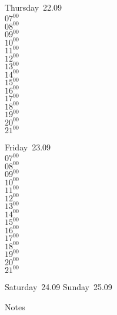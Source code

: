 \documentclass[11pt,a4paper]{book}\usepackage[]{graphicx}\usepackage[]{color}
\begin{document}
\clearpage
\begin{headerbox}
\end{headerbox}
\begin{weekdaybox}
  Thursday~22.09\\
  { 
  \vfill
  $07^{00}$\\
$08^{00}$\\
$09^{00}$\\
$10^{00}$\\
$11^{00}$\\
$12^{00}$\\
$13^{00}$\\
$14^{00}$\\
$15^{00}$\\
$16^{00}$\\
$17^{00}$\\
$18^{00}$\\
$19^{00}$\\
$20^{00}$\\
$21^{00}$\\
  }
\end{weekdaybox} 
\begin{weekdaybox}
  Friday~23.09\\
  { 
  \vfill
  $07^{00}$\\
$08^{00}$\\
$09^{00}$\\
$10^{00}$\\
$11^{00}$\\
$12^{00}$\\
$13^{00}$\\
$14^{00}$\\
$15^{00}$\\
$16^{00}$\\
$17^{00}$\\
$18^{00}$\\
$19^{00}$\\
$20^{00}$\\
$21^{00}$\\
  }
\end{weekdaybox}
\begin{weekendbox}
  Saturday~24.09
  \tcblower
  Sunday~25.09
\end{weekendbox} %
\begin{notebox}
  Notes
\end{notebox}
\clearpage
\end{document}
